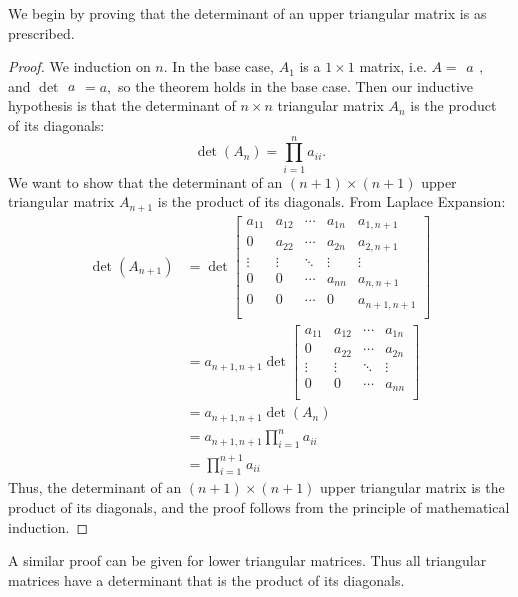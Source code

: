 We begin by proving that the determinant of an upper triangular matrix is as prescribed.

\begin{proof}
    We induction on $n.$ In the base case, $A_1$ is a $1\times 1$ matrix, i.e. $A=\begin{matrix}a\end{matrix},$ and $\det\begin{matrix}a\end{matrix} = a,$ so the theorem holds in the base case. Then our inductive hypothesis is that the determinant of $n\times n$ triangular matrix $A_n$ is the product of its diagonals: $$\det(A_n) = \prod\limits_{i=1}^{n} a_{ii}.$$ We want to show that the determinant of an $(n+1)\times(n+1)$ upper triangular matrix $A_{n+1}$ is the product of its diagonals. From Laplace Expansion:
    \begin{align*}
        \det(A_{n+1}) &= \det\begin{bmatrix}
        a_{11} & a_{12} & \cdots & a_{1n} & a_{1,n+1} \\
        0 & a_{22} & \cdots & a_{2n} & a_{2,n+1} \\
        \vdots & \vdots & \ddots & \vdots & \vdots \\
        0 & 0 & \cdots & a_{nn} & a_{n,n+1} \\
        0 & 0 & \cdots & 0 & a_{n+1,n+1} \\
        \end{bmatrix} \\
        &= a_{n+1,n+1}\det\begin{bmatrix}
        a_{11} & a_{12} & \cdots & a_{1n} \\
        0 & a_{22} & \cdots & a_{2n} \\
        \vdots & \vdots & \ddots & \vdots \\
        0 & 0 & \cdots & a_{nn} \\
        \end{bmatrix} \\
        &= a_{n+1,n+1}\det(A_n) \\
        &= a_{n+1,n+1}\prod\limits_{i=1}^{n} a_{ii} \\
        &= \prod\limits_{i=1}^{n+1} a_{ii}
    \end{align*}
    Thus, the determinant of an $(n+1)\times(n+1)$ upper triangular matrix is the product of its diagonals, and the proof follows from the principle of mathematical induction.
\end{proof}

A similar proof can be given for lower triangular matrices. Thus all triangular matrices have a determinant that is the product of its diagonals.